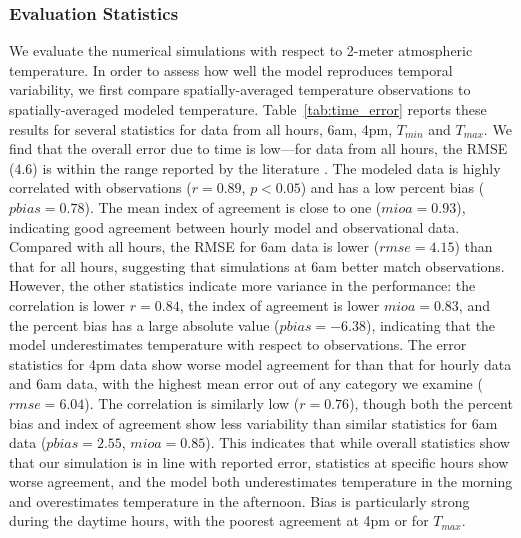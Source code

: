 \documentclass[draft,linenumbers]{agujournal}
\begin{document}
\subsubsection{Evaluation Statistics}
We evaluate the numerical simulations with respect to 2-meter atmospheric temperature. In order to assess how well the model reproduces temporal variability, we first compare spatially-averaged temperature observations to spatially-averaged modeled temperature. Table~\ref{tab:time_error} reports these results for several statistics for data from all hours, 6am, 4pm, $T_{min}$ and $T_{max}$.  We find that the overall error due to time is low---for data from all hours, the RMSE (4.6) is within the range reported by the literature \citep{kim2013evaluation}. 
The modeled data is highly correlated with observations ($r=0.89$, $p<0.05$) and has a low percent bias ($pbias = 0.78$). The mean index of agreement is close to one ($mioa=0.93$), indicating good agreement between hourly model and observational data.
Compared with all hours, the RMSE for 6am data is lower ($rmse= 4.15$) than that for all hours, suggesting that simulations at 6am better match observations. However, the other statistics indicate more variance in the performance:  the correlation is lower $r=0.84$, the index of agreement is lower $mioa=0.83$, and the percent bias has a large absolute value ($pbias=-6.38$), indicating that the model underestimates temperature with respect to observations. 
%
The error statistics for 4pm data show worse model agreement for than that for hourly data and 6am data, with the highest mean error out of any category we examine ($rmse=6.04$). The correlation is similarly low ($r=0.76$), though both the percent bias and index of agreement show less variability than similar statistics for 6am data ($pbias=2.55$, $mioa=0.85$). This indicates that while overall statistics show that our simulation is in line with reported error, statistics at specific hours show worse agreement, and the model both underestimates temperature in the morning and overestimates temperature in the afternoon. Bias is particularly strong during the daytime hours, with the poorest agreement at 4pm or for $T_{max}$. 
\end{document}
